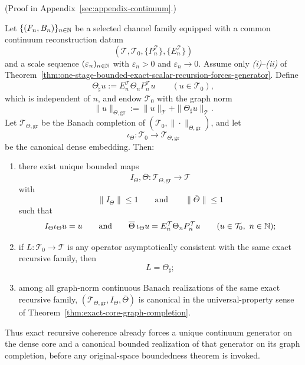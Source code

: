 (Proof in Appendix~\ref{sec:appendix-continuum}.)

\begin{theorem}
\label{thm:exact-scalar-recursion-graph-realization}
Let \(\{(F_n,B_n)\}_{n\in\mathbb{N}}\) be a selected channel family equipped with a
common continuum reconstruction datum
\[
(\mathcal T,\mathcal T_0,\{P_n^{\mathcal T}\},\{E_n^{\mathcal T}\})
\]
and a scale sequence \((\varepsilon_n)_{n\in\mathbb{N}}\) with
\(\varepsilon_n>0\) and \(\varepsilon_n\to 0\). Assume only
\emph{(i)}--\emph{(ii)} of
Theorem~\ref{thm:one-stage-bounded-exact-scalar-recursion-forces-generator}.
Define
\[
\Theta_\sharp u:=E_n^{\mathcal T}\Theta_nP_n^{\mathcal T}u
\qquad (u\in\mathcal T_0),
\]
which is independent of \(n\), and endow \(\mathcal T_0\) with the graph norm
\[
\|u\|_{\Theta,\mathrm{gr}}
:=
\|u\|_{\mathcal T}+\|\Theta_\sharp u\|_{\mathcal T}.
\]
Let \(\mathcal T_{\Theta,\mathrm{gr}}\) be the Banach completion of
\((\mathcal T_0,\|\cdot\|_{\Theta,\mathrm{gr}})\), and let
\[
\iota_\Theta:\mathcal T_0\to \mathcal T_{\Theta,\mathrm{gr}}
\]
be the canonical dense embedding. Then:
\begin{enumerate}[label=(\roman*), leftmargin=2em, itemsep=0.2em]
\item there exist unique bounded maps
      \[
      I_\Theta,\overline\Theta:\mathcal T_{\Theta,\mathrm{gr}}\to\mathcal T
      \]
      with
      \[
      \|I_\Theta\|\le 1
      \qquad\text{and}\qquad
      \|\overline\Theta\|\le 1
      \]
      such that
      \[
      I_\Theta\iota_\Theta u=u
      \qquad\text{and}\qquad
      \overline\Theta\,\iota_\Theta u
      =
      E_n^{\mathcal T}\Theta_nP_n^{\mathcal T}u
      \qquad (u\in\mathcal T_0,\ n\in\mathbb{N});
      \]
\item if \(L:\mathcal T_0\to\mathcal T\) is any operator asymptotically
      consistent with the same exact recursive family, then
      \[
      L=\Theta_\sharp;
      \]
\item among all graph-norm continuous Banach realizations of the same exact
      recursive family, \((\mathcal T_{\Theta,\mathrm{gr}},I_\Theta,
      \overline\Theta)\) is canonical in the universal-property sense of
      Theorem~\ref{thm:exact-core-graph-completion}.
\end{enumerate}
Thus exact recursive coherence already forces a unique continuum generator on
the dense core and a canonical bounded realization of that generator on its
graph completion, before any original-space boundedness theorem is invoked.
\end{theorem}

